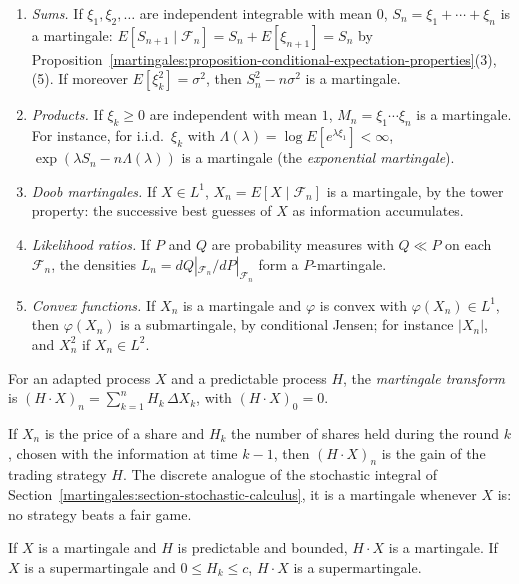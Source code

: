 \begin{example}\label{martingales:example-martingales}
\begin{enumerate}
\item \emph{Sums.} If $\xi_1, \xi_2, \ldots$ are independent integrable with mean $0$, $S_n = \xi_1 + \cdots + \xi_n$ is a martingale: $E[S_{n+1} \mid \mathcal{F}_n] = S_n + E[\xi_{n+1}] = S_n$ by
Proposition~\ref{martingales:proposition-conditional-expectation-properties}(3), (5). If moreover $E[\xi_k^2] = \sigma^2$, then $S_n^2 - n\sigma^2$ is a martingale.
\item \emph{Products.} If $\xi_k \geq 0$ are independent with mean $1$, $M_n = \xi_1\cdots\xi_n$ is a martingale. For instance, for i.i.d.\ $\xi_k$ with $\Lambda(\lambda) = \log E[e^{\lambda\xi_1}] < \infty$,
$\exp(\lambda S_n - n\Lambda(\lambda))$ is a martingale (the \emph{exponential martingale}).
\item \emph{Doob martingales.} If $X \in L^1$, $X_n = E[X \mid \mathcal{F}_n]$ is a martingale, by the tower property: the successive best guesses of $X$ as information accumulates.
\item \emph{Likelihood ratios.} If $P$ and $Q$ are probability measures with $Q \ll P$ on each $\mathcal{F}_n$, the densities $L_n = dQ|_{\mathcal{F}_n}/dP|_{\mathcal{F}_n}$ form a $P$-martingale.
\item \emph{Convex functions.} If $X_n$ is a martingale and $\varphi$ is convex with $\varphi(X_n) \in L^1$, then $\varphi(X_n)$ is a submartingale, by conditional Jensen; for instance $|X_n|$, and $X_n^2$ if $X_n \in L^2$.
\end{enumerate}
\end{example}

\begin{definition}\label{martingales:definition-transform}
For an adapted process $X$ and a predictable process $H$, the \emph{martingale transform} is $(H \cdot X)_n = \sum_{k=1}^nH_k\,\Delta X_k$, with $(H \cdot X)_0 = 0$.
\end{definition}

If $X_n$ is the price of a share and $H_k$ the number of shares held during the round $k$, chosen with the information at time $k - 1$, then $(H \cdot X)_n$ is the gain of the trading strategy $H$. The discrete analogue of the
stochastic integral of Section~\ref{martingales:section-stochastic-calculus}, it is a martingale whenever $X$ is: no strategy beats a fair game.

\begin{proposition}\label{martingales:proposition-transform}
If $X$ is a martingale and $H$ is predictable and bounded, $H \cdot X$ is a martingale. If $X$ is a supermartingale and $0 \leq H_k \leq c$, $H \cdot X$ is a supermartingale.
\end{proposition}

